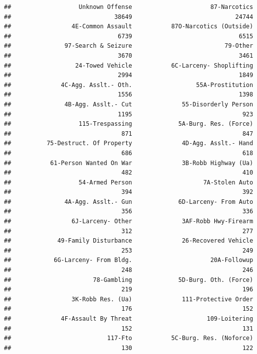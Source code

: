 \documentclass[12pt,]{book}
\theoremstyle{definition}
\theoremstyle{definition}
\theoremstyle{definition}
\theoremstyle{remark}
\begin{document}
\begin{verbatim}
##                   Unknown Offense                      87-Narcotics 
##                             38649                             24744 
##                 4E-Common Assault           87O-Narcotics (Outside) 
##                              6739                              6515 
##               97-Search & Seizure                          79-Other 
##                              3670                              3461 
##                  24-Towed Vehicle           6C-Larceny- Shoplifting 
##                              2994                              1849 
##              4C-Agg. Asslt.- Oth.                  55A-Prostitution 
##                              1556                              1398 
##               4B-Agg. Asslt.- Cut              55-Disorderly Person 
##                              1195                               923 
##                   115-Trespassing             5A-Burg. Res. (Force) 
##                               871                               847 
##          75-Destruct. Of Property              4D-Agg. Asslt.- Hand 
##                               686                               618 
##           61-Person Wanted On War              3B-Robb Highway (Ua) 
##                               482                               410 
##                   54-Armed Person                    7A-Stolen Auto 
##                               394                               392 
##               4A-Agg. Asslt.- Gun             6D-Larceny- From Auto 
##                               356                               336 
##                 6J-Larceny- Other              3AF-Robb Hwy-Firearm 
##                               312                               277 
##             49-Family Disturbance              26-Recovered Vehicle 
##                               253                               249 
##            6G-Larceny- From Bldg.                      20A-Followup 
##                               248                               246 
##                       78-Gambling             5D-Burg. Oth. (Force) 
##                               219                               196 
##                 3K-Robb Res. (Ua)              111-Protective Order 
##                               176                               152 
##              4F-Assault By Threat                     109-Loitering 
##                               152                               131 
##                           117-Fto           5C-Burg. Res. (Noforce) 
##                               130                               122 

\end{verbatim}
\end{document}
